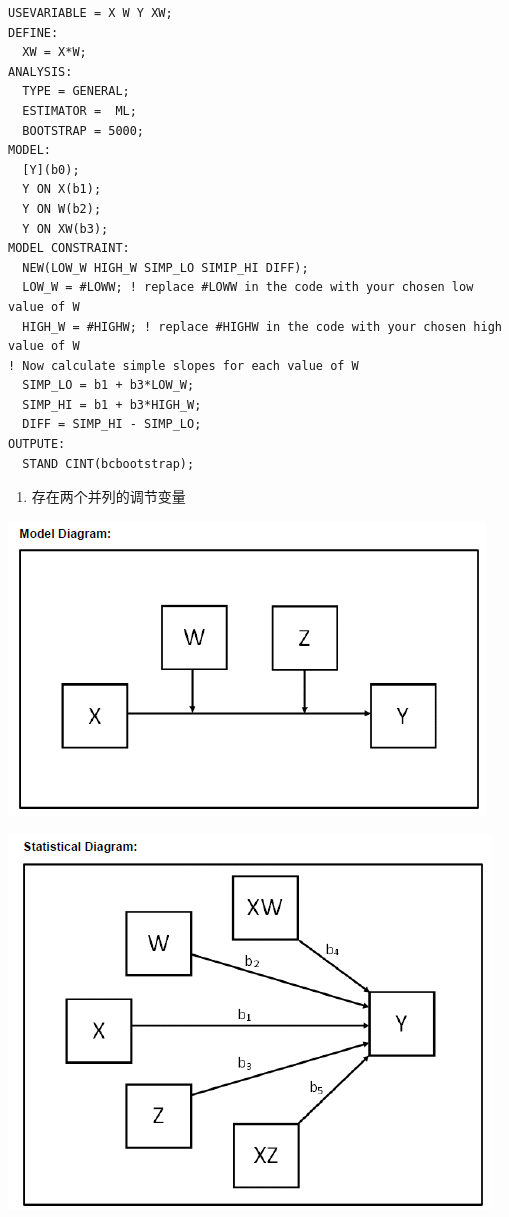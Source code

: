 \documentclass[
]{book}
\providecommand{\tightlist}{%
  \setlength{\itemsep}{0pt}\setlength{\parskip}{0pt}}
\begin{document}
\begin{verbatim}
USEVARIABLE = X W Y XW;
DEFINE:
  XW = X*W;
ANALYSIS:
  TYPE = GENERAL;
  ESTIMATOR =  ML;
  BOOTSTRAP = 5000;
MODEL:
  [Y](b0);
  Y ON X(b1);
  Y ON W(b2);
  Y ON XW(b3);
MODEL CONSTRAINT:
  NEW(LOW_W HIGH_W SIMP_LO SIMIP_HI DIFF);
  LOW_W = #LOWW; ! replace #LOWW in the code with your chosen low value of W
  HIGH_W = #HIGHW; ! replace #HIGHW in the code with your chosen high value of W
! Now calculate simple slopes for each value of W
  SIMP_LO = b1 + b3*LOW_W;
  SIMP_HI = b1 + b3*HIGH_W;
  DIFF = SIMP_HI - SIMP_LO;
OUTPUTE:
  STAND CINT(bcbootstrap);
\end{verbatim}

\begin{enumerate}
\def\labelenumi{\arabic{enumi}.}
\setcounter{enumi}{1}
\tightlist
\item
  存在两个并列的调节变量
\end{enumerate}

\includegraphics{figs/1113.png}

\includegraphics{figs/1114.png}
\end{document}
